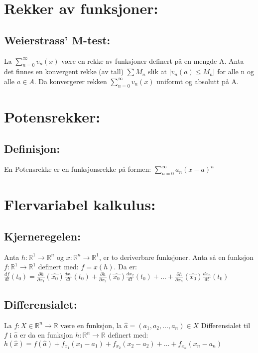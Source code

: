 \documentclass[8pt,a4paper,twocolumn,twoside]{article}
\def\abs#1{\lvert #1 \rvert}
\def\real{\mathbb{R}}
\def\suminfty#1#2{\sum_{n=#1}^\infty #2}
\def\der#1#2#3{\frac{d #1}{d #2}\left( #3 \right)}
\def\parder#1#2#3{\frac{\partial #1}{\partial #2}\left( #3 \right)}
\begin{document}
    \section*{Rekker av funksjoner:}
        \subsection*{Weierstrass' M-test:}
        La $\suminfty{0}{v_n(x)}$ være en rekke av funksjoner definert på en mengde A. Anta det finnes en konvergent rekke (av tall) $\sum M_n$ slik at 
        $\abs{v_n(a) \leq M_n}$ for alle n og alle $a\in A$. Da konvergerer rekken $\suminfty{0}{v_n(x)}$ uniformt og absolutt på A.
    \section*{Potensrekker:}
        \subsection*{Definisjon:}
        En Potensrekke er en funksjonsrekke på formen: $\suminfty{0}{a_n(x-a)^n}$

    \section*{Flervariabel kalkulus:}
        \subsection*{Kjerneregelen:}
            Anta $h:\real^1\to\real^n$ og $x:\real^n\to\real^1$, er to deriverbare funksjoner. Anta så en funksjon $f:\real^1\to\real^1$ definert med:
            $f = x(h)$. Da er:
            $\der{f}{t}{t_0}=\parder{h}{x_1}{\hat{x_0}}\der{x_1}{t}{t_0}+\parder{h}{x_2}{\hat{x_0}}\der{x_2}{t}{t_0}+\dots+\parder{h}{x_n}{\hat{x_0}}\der{x_n}{t}{t_0}$
        \subsection*{Differensialet:}
        La $f:X\in\real^n\to\real$ være en funksjon, la $\hat{a}=(a_1,a_2,\dots,a_n)\in X$ Differensialet til $f$ i $\hat{a}$ er da en funksjon $h:\real^n\to\real$ definert
        med: $h(\hat{x})=f(\hat{a})+f_{x_1}(x_1-a_1)+f_{x_2}(x_2-a_2)+\dots+f_{x_n}(x_n-a_n)$
\end{document}
